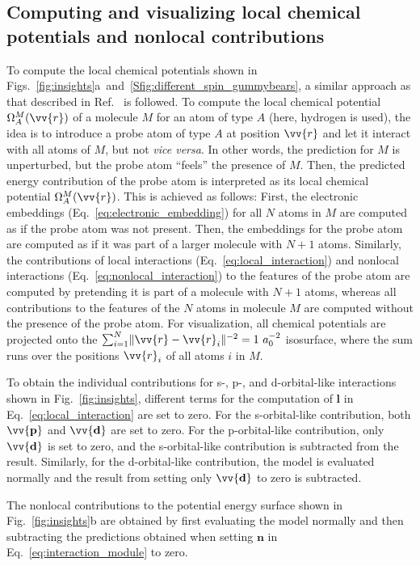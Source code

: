 \documentclass[%
superscriptaddress,
reprint,
nofootinbib,
amsmath,amssymb,amsfonts,
floatfix,
altaffilletter,
showkeys,
]{revtex4-2}
\begin{document}
\subsection*{Computing and visualizing local chemical potentials and nonlocal contributions}
To compute the local chemical potentials shown in Figs.~\ref{fig:insights}a~and~\ref{Sfig:different_spin_gummybears}, a similar approach as that described in Ref.~ is followed. To compute the local chemical potential $\Omega_A^M(\vv{r})$ of a molecule $M$ for an atom of type $A$ (here, hydrogen is used), the idea is to introduce a probe atom of type $A$ at position $\vv{r}$ and let it interact with all atoms of $M$, but not \textit{vice versa}. In other words, the prediction for $M$ is unperturbed, but the probe atom ``feels'' the presence of $M$. Then, the predicted energy contribution of the probe atom is interpreted as its local chemical potential $\Omega_A^M(\vv{r})$. This is achieved as follows: First, the electronic embeddings (Eq.~\ref{eq:electronic_embedding}) for all $N$ atoms in $M$ are computed as if the probe atom was not present. Then, the embeddings for the probe atom are computed as if it was part of a larger molecule with $N+1$ atoms. Similarly, the contributions of local interactions (Eq.~\ref{eq:local_interaction}) and nonlocal interactions (Eq.~\ref{eq:nonlocal_interaction}) to the features of the probe atom are computed by pretending it is part of a molecule with $N+1$ atoms, whereas all contributions to the features of the $N$ atoms in molecule $M$ are computed without the presence of the probe atom. For visualization, all chemical potentials are projected onto the $\sum_{i=1}^{N}\lVert \vv{r}-\vv{r}_i \rVert^{-2} = 1~a_0^{-2}$ isosurface, where the sum runs over the positions $\vv{r}_i$ of all atoms $i$ in $M$.

To obtain the individual contributions for s-, p-, and d-orbital-like interactions shown in Fig.~\ref{fig:insights}, different terms for the computation of $\mathbf{l}$ in Eq.~\ref{eq:local_interaction} are set to zero. For the s-orbital-like contribution, both $\vv{\mathbf{p}}$ and $\vv{\mathbf{d}}$ are set to zero. For the p-orbital-like contribution, only $\vv{\mathbf{d}}$ is set to zero, and the s-orbital-like contribution is subtracted from the result. Similarly, for the d-orbital-like contribution, the model is evaluated normally and the result from setting only $\vv{\mathbf{d}}$ to zero is subtracted.

The nonlocal contributions to the potential energy surface shown in Fig.~\ref{fig:insights}b are obtained by first evaluating the model normally and then subtracting the predictions obtained when setting $\mathbf{n}$ in Eq.~\ref{eq:interaction_module} to zero.
\end{document}
